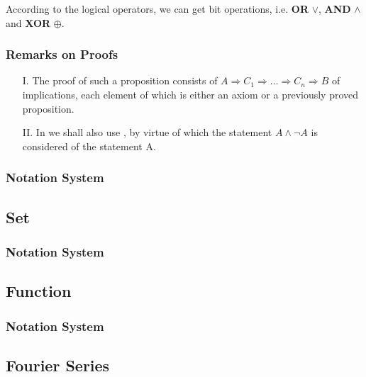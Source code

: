 According to the logical operators, we can get bit operations, 
i.e. \textbf{OR} $\vee$, \textbf{AND} $\wedge$ and \textbf{XOR} $\oplus$.

\crule

\subsubsection{Remarks on Proofs} 

\begin{itemize}
  \item[I.] The proof of such a proposition consists of 
    $A \Rightarrow C_1 \Rightarrow \dots \Rightarrow C_n \Rightarrow B$
    of implications, each element of which is either an axiom or 
    a previously proved proposition.
  \item[II.] In  we shall also use 
    , by virtue of which the statement
    $A \wedge \neg{A}$ is considered  of the statement A.
\end{itemize}

\crule

\subsubsection{Notation System}

\subsection{Set}

\subsubsection{Notation System}

\subsection{Function}

\subsubsection{Notation System}

\subsection{Fourier Series}

